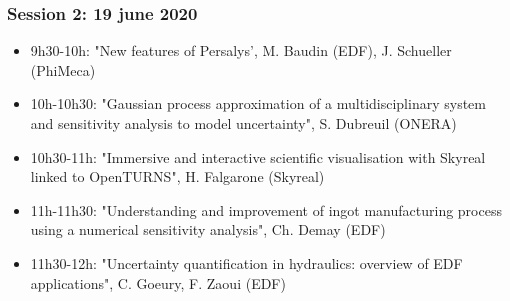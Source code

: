 \documentclass{beamer}
\begin{document}
\begin{frame}
\frametitle{Session 2: 19 june 2020}

% 
\begin{itemize}
\item 9h30-10h: "New features of Persalys', M. Baudin (EDF), J. Schueller (PhiMeca)
\item 10h-10h30: "Gaussian process approximation of a multidisciplinary system and sensitivity analysis to model uncertainty", S. Dubreuil (ONERA)
\item 10h30-11h: "Immersive and interactive scientific visualisation with Skyreal linked to OpenTURNS", H. Falgarone (Skyreal)
\item 11h-11h30: "Understanding and improvement of ingot manufacturing process using a numerical sensitivity analysis", Ch. Demay (EDF)
\item 11h30-12h: "Uncertainty quantification in hydraulics: overview of EDF applications", C. Goeury, F. Zaoui (EDF)
\end{itemize}



\end{frame}
\end{document}
